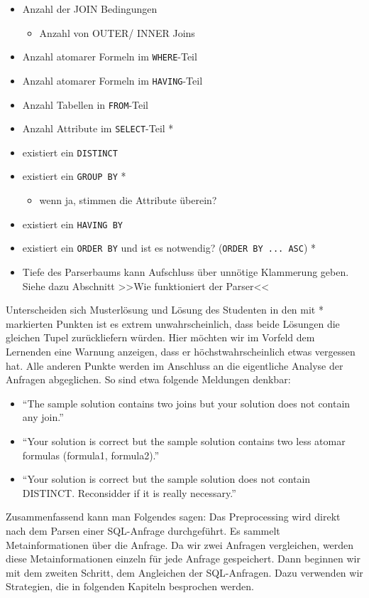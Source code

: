 \begin{itemize}
\item Anzahl der JOIN Bedingungen
	\begin{itemize}
	\item Anzahl von OUTER/ INNER Joins
	\end{itemize}
\item Anzahl atomarer Formeln im \verb|WHERE|-Teil
\item Anzahl atomarer Formeln im \verb|HAVING|-Teil
\item Anzahl Tabellen in \verb|FROM|-Teil
\item Anzahl Attribute im \verb|SELECT|-Teil *
\item existiert ein \verb|DISTINCT|
\item existiert ein \verb|GROUP BY| *
	\begin{itemize}
	\item wenn ja, stimmen die Attribute überein?
	\end{itemize}	 
\item existiert ein \verb|HAVING BY|
\item existiert ein \verb|ORDER BY| und ist es notwendig? (\verb|ORDER BY ... ASC|) *
\item Tiefe des Parserbaums kann Aufschluss über unnötige Klammerung geben. Siehe dazu Abschnitt >>Wie funktioniert der Parser<<
\end{itemize}

Unterscheiden sich Musterlösung und Lösung des Studenten in den mit * markierten Punkten ist es extrem unwahrscheinlich, dass beide Lösungen die gleichen Tupel zurückliefern würden. Hier möchten wir im Vorfeld dem Lernenden eine Warnung anzeigen, dass er höchstwahrscheinlich etwas vergessen hat. Alle anderen Punkte werden im Anschluss an die eigentliche Analyse der Anfragen abgeglichen. So sind etwa folgende Meldungen denkbar:

\begin{itemize}
\item ``The sample solution contains two joins but your solution does not contain any join.''
\item ``Your solution is correct but the sample solution contains two less atomar formulas (formula1, formula2).''
\item ``Your solution is correct but the sample solution does not contain DISTINCT. Reconsidder if it is really necessary.''
\end{itemize}

Zusammenfassend kann man Folgendes sagen: Das Preprocessing wird direkt nach dem Parsen einer SQL-Anfrage durchgeführt. Es sammelt Metainformationen über die Anfrage. Da wir zwei Anfragen vergleichen, werden diese Metainformationen einzeln für jede Anfrage gespeichert. Dann beginnen wir mit dem zweiten Schritt, dem Angleichen der SQL-Anfragen. Dazu verwenden wir Strategien, die in folgenden Kapiteln besprochen werden.


